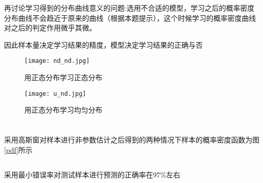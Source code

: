 \documentclass[UTF8,a4paper]{ctexart}
\begin{document}
再讨论学习得到的分布曲线意义的问题:选用不合适的模型，学习之后的概率密度分布曲线不会趋近于原来的曲线（根据本题提示），这个时候学习的概率密度曲线对之后的判定作用微乎其微。

因此样本量决定学习结果的精度，模型决定学习结果的正确与否

\begin{figure}
\centering
\texttt{[image: nd\_nd.jpg]}
\caption{用正态分布学习正态分布}
\label{nd_nd}
\texttt{[image: u\_nd.jpg]}
\caption{用正态分布学习均匀分布}
\label{u_nd}
\end{figure}
\section{}
\subsection{}
采用高斯窗对样本进行非参数估计之后得到的两种情况下样本的概率密度函数为图\ref{pdf}所示
\subsection{}
采用最小错误率对测试样本进行预测的正确率在97\%左右
\subsection{}
\subsection{}
\end{document}
